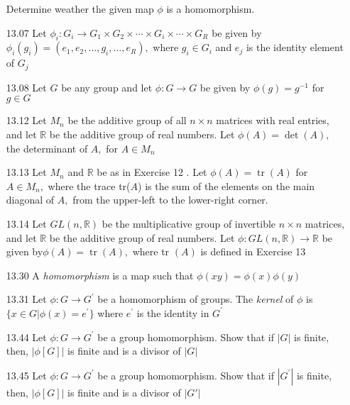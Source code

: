 \documentclass[12pt]{article}
\newcommand{\R}{\mathbb{R}}
\begin{document}
\begin{enumerate}
	\item[]Determine weather the given map $ \phi $ is a homomorphism. 
	\item[13.07] Let $ \phi _ { i } : G _ { i } \rightarrow G _ { 1 } \times G _ { 2 } \times \cdots \times G _ { i } \times \cdots \times G _ R $ be given by $ \phi _ { i } \left( g _ { i } \right) = \left( e _ { 1 } , e _ { 2 } , \ldots , g _ { i } , \ldots , e _ R \right) ,$ where $ g _ { i } \in G_i $ and $e _ { j } $ is the identity element of $G _ { j }$
	
	\item[13.08] Let $ G $  be any group and let $ \phi : G \rightarrow G $  be given by $ \phi ( g ) = g ^ { - 1}$ for $g \in G $
	
	\item[13.12] Let $ M _ { n } $  be the additive group of all $ n \times n $  matrices with real entries, and let $ \R $  be the additive group of real numbers. Let $ \phi ( A ) = \operatorname { det } ( A ) , $  the determinant of $A , $  for $ A \in M _ { n }$
	
	\item[13.13]Let $ M _ { n } $ and $ \R $ be as in Exercise 12 . Let $ \phi ( A ) = \operatorname { tr } ( A ) $ for $ A \in M _ { n } , $ where the trace tr($A$) is the sum of the elements on the main diagonal of $ A , $ from the upper-left to the lower-right corner.
	
	\item[13.14] Let $ G L ( n , \R ) $ be the multiplicative group of invertible $ n \times n $ matrices, and let $ \R $ be the additive group of real numbers. Let $ \phi : G L ( n , \R ) \rightarrow \R $ be given by$ \phi ( A ) = \operatorname { tr } ( A ) ,$ where  tr $( A ) $ is defined in Exercise 13
	
	\item[13.30] A \textit{homomorphism} is a map such that $ \phi ( x y ) = \phi ( x ) \phi ( y ) $
	
	\item[13.31] Let $ \phi : G \rightarrow G ^ { \prime } $ be a homomorphism of groups. The \textit{kernel} of $ \phi $ is$ \{ x \in G | \phi ( x ) = e ^ { \prime } \} $ where $ e ^ { \prime } $ is the identity in $ G^{\prime} $
	
	\item[13.44] Let $ \phi : G \rightarrow G ^ { \prime } $ be a group homomorphism. Show that if $ \left| G \right| $ is finite, then, $ | \phi [ G ] | $ is finite and is a divisor of $ | G | $
	\item[13.45] Let $ \phi : G \rightarrow G ^ { \prime } $ be a group homomorphism. Show that if $ \left| G ^ { \prime } \right| $ is finite, then, $ | \phi [ G ] | $ is finite and is a divisor of $ | G' | $
	

\end{enumerate}
\end{document}
